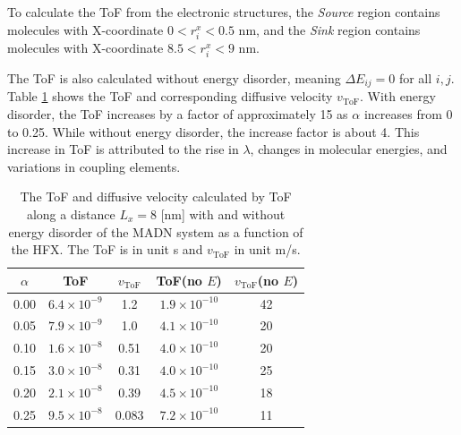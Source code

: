 \documentclass[%
 reprint,
 amsmath,amssymb,
 aps,
]{revtex4-2}
\begin{document}
To calculate the ToF from the electronic structures, the \textit{Source} region contains molecules with X-coordinate $0 < r^x_i < 0.5$ nm, and the \textit{Sink} region contains molecules with X-coordinate $8.5 < r^x_i < 9$ nm. 

The ToF is also calculated without energy disorder, meaning $\Delta E_{ij}=0$ for all $i,j$.
Table \ref{tab:ToF_MADN_HFX} shows the ToF and corresponding diffusive velocity $v_\text{ToF}$.
With energy disorder, the ToF increases by a factor of approximately 15 as $\alpha$ increases from 0 to 0.25.  
While without energy disorder, the increase factor is about 4. This increase in ToF is attributed to the rise in $\lambda$, changes in molecular energies, and variations in coupling elements.

\begin{table}[tbp]%
\caption{\label{tab:ToF_MADN_HFX}%
The ToF and diffusive velocity calculated by ToF along a distance $L_x = 8$ [nm] with and without energy disorder of the MADN system as a function of the HFX. The ToF is in unit \unit[]{s} and $v_\text{ToF}$ in unit \unit[]{m/s}.
}
\begin{ruledtabular}
  \begin{tabular}{c c c c c}
        $\alpha$ & ToF& $v_\text{ToF}$ & ToF(no $E$)& $v_\text{ToF}$(no $E$) \\
    \hline
        0.00 &  $6.4 \times 10^{-9}$ & 1.2 & $1.9 \times 10^{-10}$ & 42 \\
        0.05 & $ 7.9 \times 10^{-9}$ & 1.0 & $4.1 \times 10^{-10}$ & 20 \\
        0.10 & $ 1.6 \times 10^{-8}$ & 0.51 & $4.0 \times 10^{-10} $ & 20 \\
        0.15 & $ 3.0 \times 10^{-8}$ & 0.31 & $4.0 \times 10^{-10} $ & 25 \\
        0.20 & $ 2.1 \times 10^{-8}$ & 0.39 & $4.5 \times 10^{-10}$ & 18 \\
        0.25 & $ 9.5 \times 10^{-8}$ & 0.083 & $7.2 \times 10^{-10}$ & 11 \\
    \end{tabular}
\end{ruledtabular}
\end{table}
\end{document}
